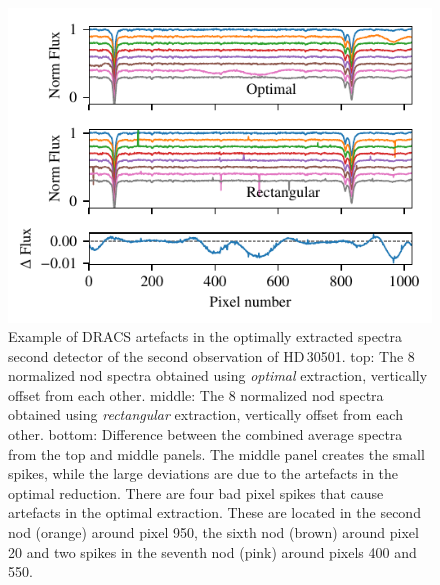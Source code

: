 \begin{figure}
    \centering
    \includegraphics[width=0.7\linewidth]{figures/appendix/bp_plots/extraction_comparision_HD30501-2b_chip_2}
    \caption{Example of DRACS artefacts in the optimally extracted spectra second detector of the second observation of {HD\,30501}.
        top: The 8 normalized nod spectra obtained using \emph{optimal} extraction, vertically offset from each other.
        middle: The 8 normalized nod spectra obtained using \emph{rectangular} extraction, vertically offset from each other.
        bottom: Difference between the combined average spectra from the top and middle panels.
        The middle panel creates the small spikes, while the large deviations are due to the artefacts in the optimal reduction.
        There are four bad pixel spikes that cause artefacts in the optimal extraction.
        These are located in the second nod (orange) around pixel 950, the sixth nod (brown) around pixel 20 and two spikes in the seventh nod (pink) around pixels 400 and 550.}
    \label{fig:artefact_example7}
\end{figure}


